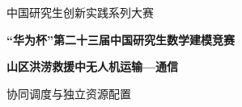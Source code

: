 \documentclass[withoutpreface,colorprint]{format}
\begin{document}
\song{}
\setcounter{page}{1}
\begin{center}
{\heiti 中国研究生创新实践系列大赛\par}
\vspace{.3em}
{\bfseries\heiti “华为杯”第二十三届中国研究生数学建模竞赛\par}
\vspace{.7em}
{\bfseries\heiti 山区洪涝救援中无人机运输—通信\par 协同调度与独立资源配置\par}
\end{center}
\begin{abstract}

\end{abstract}
{\linespread{1.08}\selectfont\tableofcontents}\clearpage









\FloatBarrier\clearpage


\clearpage\appendix

\end{document}
